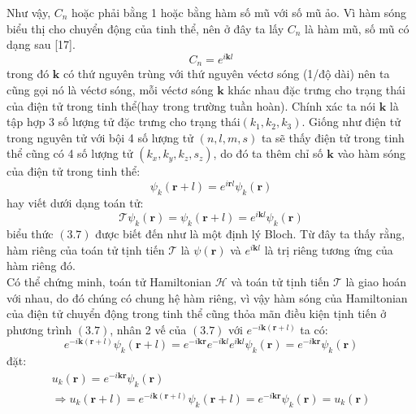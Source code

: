 Như vậy, $C_n$ hoặc phải bằng 1 hoặc bằng hàm số mũ với số mũ ảo. Vì hàm sóng biểu thị cho chuyển động của tinh thể, nên ở đây ta lấy $C_n$ là hàm mũ, số mũ có dạng sau [17].
\begin{equation}
C_n = e^{i\mathbf{k}\mathit{l}}
\end{equation}
trong đó $\mathbf{k}$ có thứ  nguyên trùng với thứ nguyên véctơ sóng (1/độ dài) nên ta cũng gọi nó là véctơ sóng, mỗi véctơ sóng  $\mathbf{k}$ khác nhau đặc trưng cho trạng thái của điện tử trong tinh thể(hay trong trường tuần hoàn). Chính xác ta nói  $\mathbf{k}$ là tập hợp 3 số lượng tử  đặc trưng cho trạng thái$\left(k_1,k_2,k_3\right)$. Giống như điện tử trong nguyên tử với bội 4 số lượng tử $\left(n,l,m,s\right)$ ta sẽ thấy điện tử trong tinh thể cũng có 4 số lượng tử $\left(k_x,k_y,k_z,s_z\right)$, do đó ta thêm chỉ số $\mathbf{k}$ vào hàm sóng của điện tử trong tinh thể:
\begin{equation}
\psi_k\left(\mathbf{r} + \mathit{l}\right) = e^{i\mathbf{r}\mathit{l}}\psi_k\left(\mathbf{r}\right)
\end{equation}
hay viết dưới dạng toán tử:
\begin{equation}
\mathcal{T}\psi_k\left(\mathbf{r}\right) = \psi_k\left(\mathbf{r}+\mathit{l}\right) = e^{i\mathbf{k}\mathit{l}}\psi_k\left(\mathbf{r}\right)
\end{equation}
biểu thức $(3.7)$ được biết đến như là một định lý Bloch.
Từ đây ta thấy rằng, hàm riêng của toán tử tịnh tiến $\mathcal{T}$ là $\psi\left(\mathbf{r}\right)$ và $e^{i\mathbf{k}\mathit{l}}$ là trị riêng tương ứng của hàm riêng đó.\\
Có thể chứng minh, toán tử Hamiltonian $\mathcal{H}$ và toán tử tịnh tiến $\mathcal{T}$ là giao hoán với nhau, do đó chúng có chung hệ hàm riêng, vì vậy hàm sóng của Hamiltonian của điện tử chuyển động trong tinh thể cũng thỏa mãn điều kiện tịnh tiến ở phương trình $(3.7)$, nhân 2 vế của $(3.7)$ với 
$e^{-i\mathbf{k}(\mathbf{r}+\mathit{l})}$ ta có:
\begin{equation}
e^{-i\mathbf{k}\left(\mathbf{r}+\mathit{l}\right)}\psi_k
\left(\mathbf{r}+\mathit{l}\right)
 = e^{-i\mathbf{kr}}e^{-i\mathbf{k}\mathit{l}}
 e^{i\mathbf{k}\mathit{l}}\psi_k\left(\mathbf{r}\right) =
  e^{-i\mathbf{kr}}\psi_k\left(\mathbf{r}\right)
\end{equation}
đặt:
\begin{gather}
u_k\left(\mathbf{r}\right) = e^{-i\mathbf{kr}}\psi_k\left(\mathbf{r}\right) \\
\Longrightarrow   u_k\left(\mathbf{r}+\mathit{l}\right) = 
e^{-i\mathbf{k}\left(\mathbf{r}+\mathit{l}\right)}
\psi_k\left(\mathbf{r}+\mathit{l}\right) =
e^{-i\mathbf{kr}}\psi_k\left(\mathbf{r}\right) = u_k\left(\mathbf{r}\right)
\end{gather}
